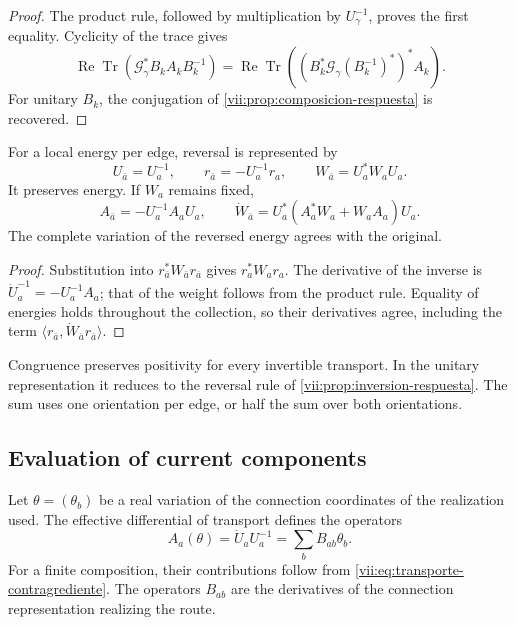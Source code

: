\begin{proof}
The product rule, followed by multiplication by
\(U_\gamma^{-1}\), proves the first equality. Cyclicity
of the trace gives
\[
 \operatorname{Re}\operatorname{Tr}
  (\mathcal G_\gamma^*B_kA_kB_k^{-1})
 =\operatorname{Re}\operatorname{Tr}
  ((B_k^*\mathcal G_\gamma(B_k^{-1})^*)^*A_k).
\]
For unitary \(B_k\), the conjugation of
\ref{vii:prop:composicion-respuesta} is recovered.
\end{proof}

\begin{proposition}
\label{vii:prop:inversion-congruencia}
For a local energy per edge, reversal is represented by
\begin{equation}
 U_{\bar a}=U_a^{-1},\qquad
 r_{\bar a}=-U_a^{-1}r_a,\qquad
 W_{\bar a}=U_a^*W_aU_a.
 \label{vii:eq:inversion-peso-general}
\end{equation}
It preserves energy. If \(W_a\) remains fixed,
\[
 A_{\bar a}=-U_a^{-1}A_aU_a,\qquad
 \dot W_{\bar a}=U_a^*(A_a^*W_a+W_aA_a)U_a.
\]
The complete variation of the reversed energy agrees with the original.
\end{proposition}

\begin{proof}
Substitution into \(r_{\bar a}^*W_{\bar a}r_{\bar a}\)
gives \(r_a^*W_ar_a\). The derivative of the inverse is
\(\dot U_a^{-1}=-U_a^{-1}A_a\); that of the weight follows from
the product rule. Equality of energies holds throughout the
collection, so their derivatives agree, including the term
\(\langle r_{\bar a},\dot W_{\bar a}r_{\bar a}\rangle\).
\end{proof}

Congruence preserves positivity for every invertible transport.
In the unitary representation it reduces to the reversal rule of
\ref{vii:prop:inversion-respuesta}. The sum uses one orientation
per edge, or half the sum over both orientations.

\subsection{Evaluation of current components}

Let \(\theta=(\theta_b)\) be a real variation of the connection
coordinates of the realization used. The effective differential of
transport defines the operators
\begin{equation}
 A_a(\theta)=\dot U_aU_a^{-1}
     =\sum_bB_{ab}\theta_b.
 \label{vii:eq:diferencial-conexion-transporte}
\end{equation}
For a finite composition, their contributions follow from
\eqref{vii:eq:transporte-contragrediente}. The operators
\(B_{ab}\) are the derivatives of the connection representation
realizing the route.

